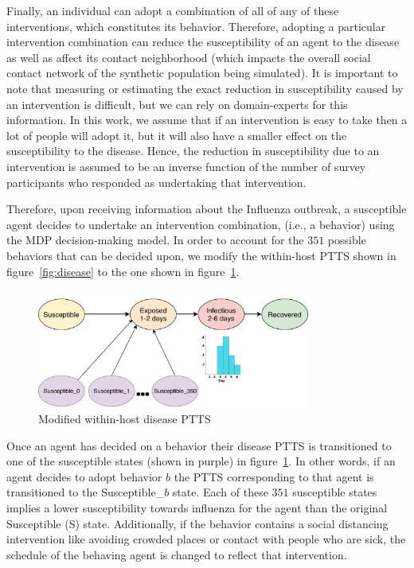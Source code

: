 \documentclass[doublespace,draft]{VTthesis}
\begin{document}
    Finally, an individual can adopt a combination of all of any of these interventions, which constitutes its behavior. Therefore, adopting a particular intervention combination can reduce the susceptibility of an agent to the disease as well as affect its contact neighborhood (which impacts the overall social contact network of the synthetic population being simulated). It is important to note that measuring or estimating the exact reduction in susceptibility caused by an intervention is difficult, but we can rely on domain-experts for this information. In this work, we assume that if an intervention is easy to take then a lot of people will adopt it, but it will also have a smaller effect on the susceptibility to the disease. Hence, the reduction in susceptibility due to an intervention is assumed to be an inverse function of the number of survey participants who responded as undertaking that intervention. 
    
    Therefore, upon receiving information about the Influenza outbreak, a susceptible agent decides to undertake an intervention combination, (i.e., a behavior) using the MDP decision-making model. In order to account for the $351$ possible behaviors that can be decided upon, we modify the within-host PTTS shown in figure~\ref{fig:disease} to the one shown in figure~\ref{fig:disease-behavs}.
    
    \begin{figure}
    \centering
    \includegraphics[width=0.8\textwidth]{figures/disease-fsm-behavs.pdf}
    \caption{Modified within-host disease PTTS}
    \label{fig:disease-behavs}
    \end{figure}
    
    Once an agent has decided on a behavior their disease PTTS is transitioned to one of the susceptible states (shown in purple) in figure~\ref{fig:disease-behavs}. In other words, if an agent decides to adopt behavior $b$ the PTTS corresponding to that agent is transitioned to the Susceptible\_$b$ state. Each of these $351$ susceptible states implies a lower susceptibility towards influenza for the agent than the original Susceptible (S) state. Additionally, if the behavior contains a social distancing intervention like avoiding crowded places or contact with people who are sick, the schedule of the behaving agent is changed to reflect that intervention. 
    
\end{document}
